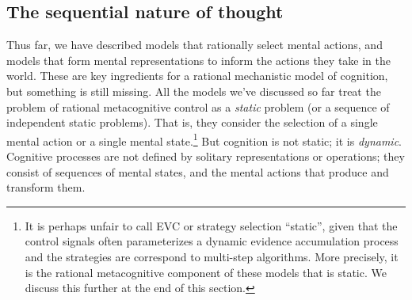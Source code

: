 


\subsection{The sequential nature of thought}\label{sec:intro-sequential}

Thus far, we have described models that rationally select mental actions, and models that form mental representations to inform the actions they take in the world. These are key ingredients for a rational mechanistic model of cognition, but something is still missing. All the models we've discussed so far treat the problem of rational metacognitive control as a \emph{static} problem (or a sequence of independent static problems). That is, they consider the selection of a single mental action or a single mental state.\footnote{%
  It is perhaps unfair to call EVC or strategy selection ``static'', given that the control signals often parameterizes a dynamic evidence accumulation process and the strategies are correspond to multi-step algorithms. More precisely, it is the rational metacognitive component of these models that is static. We discuss this further at the end of this section.
} But cognition is not static; it is \emph{dynamic}. Cognitive processes are not defined by solitary representations or operations; they consist of sequences of mental states, and the mental actions that produce and transform them.

